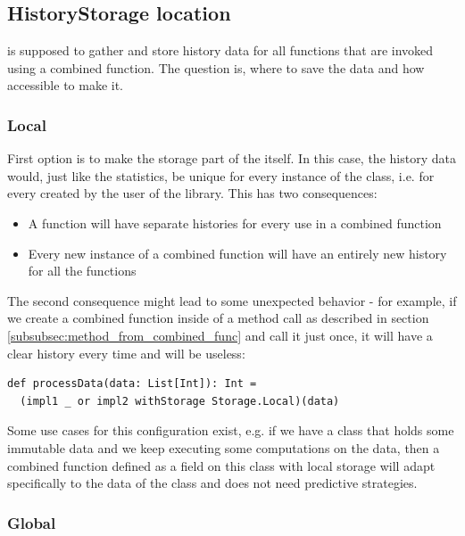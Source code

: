 \subsection{HistoryStorage location}
\label{subsec:storing}

 is supposed to gather and store history data for all functions that are invoked using a combined function. The question is, where to save the data and how accessible to make it.

\subsubsection{Local}

First option is to make the storage part of the  itself. In this case, the history data would, just like the statistics, be unique for every instance of the class, i.e. for every  created by the user of the library. This has two consequences:

\begin{itemize}
	\item A function will have separate histories for every use in a combined function
	\item Every new instance of a combined function will have an entirely new history for all the functions
\end{itemize}

The second consequence might lead to some unexpected behavior - for example, if we create a combined function inside of a method call as described in section \ref{subsubsec:method_from_combined_func} and call it just once, it will have a clear history every time and will be useless:

\lstset{style=Scala}
\begin{lstlisting}
def processData(data: List[Int]): Int = 
  (impl1 _ or impl2 withStorage Storage.Local)(data)
\end{lstlisting}

Some use cases for this configuration exist, e.g. if we have a class that holds some immutable data and we keep executing some computations on the data, then a combined function defined as a field on this class with local storage will adapt specifically to the data of the class and does not need predictive strategies.

\subsubsection{Global}

